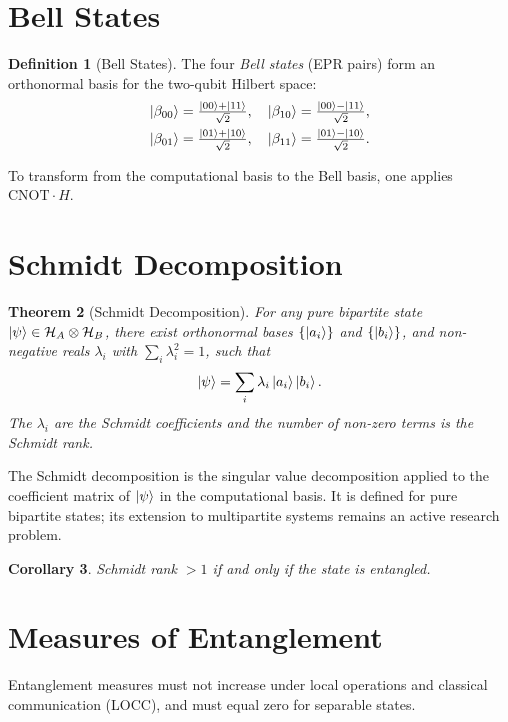 \documentclass[12pt, a4paper, oneside]{report}
\theoremstyle{plain}
\newtheorem{theorem}{Theorem}[chapter]
\newtheorem{corollary}[theorem]{Corollary}
\theoremstyle{definition}
\newtheorem{definition}[theorem]{Definition}
\theoremstyle{remark}
\newcommand{\Hcal}{\mathcal{H}}
\newcommand{\CNOT}{\mathrm{CNOT}}
\begin{document}
\section{Bell States}

\begin{definition}[Bell States]
The four \emph{Bell states} (EPR pairs) form an orthonormal basis for the two-qubit Hilbert space:
\begin{align*}
  \ket{\beta_{00}} = \tfrac{\ket{00}+\ket{11}}{\sqrt{2}}, \quad
  \ket{\beta_{10}} = \tfrac{\ket{00}-\ket{11}}{\sqrt{2}}, \\
  \ket{\beta_{01}} = \tfrac{\ket{01}+\ket{10}}{\sqrt{2}}, \quad
  \ket{\beta_{11}} = \tfrac{\ket{01}-\ket{10}}{\sqrt{2}}.
\end{align*}
\end{definition}

To transform from the computational basis to the Bell basis, one applies $\CNOT \cdot H$.

\section{Schmidt Decomposition}

\begin{theorem}[Schmidt Decomposition]
\label{thm:schmidt}
For any pure bipartite state $\ket{\psi} \in \Hcal_A \otimes \Hcal_B$, there exist
orthonormal bases $\{\ket{a_i}\}$ and $\{\ket{b_i}\}$, and non-negative reals $\lambda_i$
with $\sum_i \lambda_i^2 = 1$, such that
\[
  \ket{\psi} = \sum_i \lambda_i \ket{a_i}\ket{b_i}.
\]
The $\lambda_i$ are the \emph{Schmidt coefficients} and the number of non-zero terms is the
\emph{Schmidt rank}.
\end{theorem}

The Schmidt decomposition is the singular value decomposition applied to the coefficient
matrix of $\ket{\psi}$ in the computational basis. It is defined for pure bipartite states;
its extension to multipartite systems remains an active research problem.

\begin{corollary}
Schmidt rank $> 1$ if and only if the state is entangled.
\end{corollary}

\section{Measures of Entanglement}

Entanglement measures must not increase under local operations and classical communication
(LOCC), and must equal zero for separable states.
\end{document}
